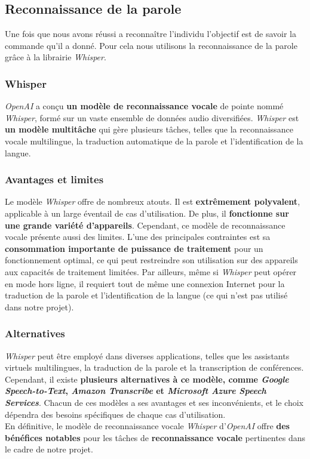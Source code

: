 \subsection{Reconnaissance de la parole}
\label{subsec:Reconnaissance_parole}

Une fois que nous avons réussi a reconnaître l'individu l'objectif est de savoir la commande qu'il a donné. Pour cela nous utilisons la reconnaissance de la parole
grâce à la librairie \textit{Whisper}.

\subsubsection*{Whisper}

\textit{OpenAI} a conçu \textbf{un modèle de reconnaissance vocale} de pointe nommé \textit{Whisper}, formé sur un vaste ensemble de données audio diversifiées.
\textit{Whisper} est \textbf{un modèle multitâche} qui gère plusieurs tâches, telles que la reconnaissance vocale multilingue,
la traduction automatique de la parole et l'identification de la langue.

\subsubsection*{Avantages et limites}
Le modèle \textit{Whisper} offre de nombreux atouts. Il est \textbf{extrêmement polyvalent}, applicable à un large éventail de cas d'utilisation.
De plus, il \textbf{fonctionne sur une grande variété d'appareils}. Cependant, ce modèle de reconnaissance vocale présente aussi des limites.
L'une des principales contraintes est sa \textbf{consommation importante de puissance de traitement} pour un fonctionnement optimal,
ce qui peut restreindre son utilisation sur des appareils aux capacités de traitement limitées.
Par ailleurs, même si \textit{Whisper} peut opérer en mode hors ligne, il requiert tout de même une connexion Internet pour la traduction
de la parole et l'identification de la langue (ce qui n'est pas utilisé dans notre projet).

\subsubsection*{Alternatives}

\textit{Whisper} peut être employé dans diverses applications, telles que les assistants virtuels multilingues,
la traduction de la parole et la transcription de conférences. Cependant, il existe
\textbf{plusieurs alternatives à ce modèle, comme \textit{Google Speech-to-Text}, \textit{Amazon Transcribe} et \textit{Microsoft Azure Speech Services}}.
Chacun de ces modèles a ses avantages et ses inconvénients, et le choix dépendra des besoins spécifiques de chaque cas d'utilisation.\\

En définitive, le modèle de reconnaissance vocale \textit{Whisper} d'\textit{OpenAI} offre \textbf{des bénéfices notables} pour les tâches de \textbf{
    reconnaissance vocale} pertinentes dans le cadre de notre projet.
